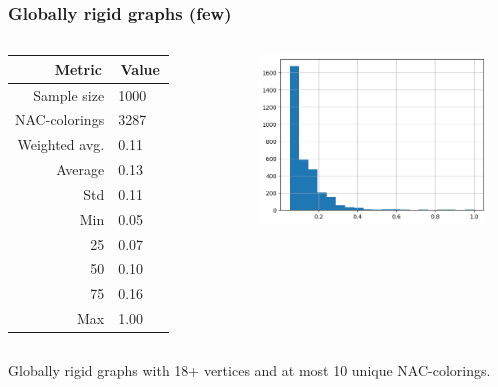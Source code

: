 \documentclass[aspectratio=\myaspectratio]{beamer}
\begin{document}
\begin{frame}
	\frametitle{Globally rigid graphs (few)}

	\begin{columns}

		\begin{table}[ht]
			\centering
			\begin{tabular}{r|l}
				\toprule
				\,Metric\,    & \,Value\, \\
				\midrule
				Sample size   & 1000      \\
				NAC-colorings & 3287      \\
				Weighted avg. & 0.11      \\
				Average       & 0.13      \\
				Std           & 0.11      \\
				Min           & 0.05      \\
				25            & 0.07      \\
				50            & 0.10      \\
				75            & 0.16      \\
				Max           & 1.00      \\
				\bottomrule
			\end{tabular}
		\end{table}


		\includegraphics[width=0.9\textwidth]{./assets/presentation_reviewer_globally_rigid_few.png}

	\end{columns}

	\centering
	Globally rigid graphs with 18+ vertices and at most 10 unique NAC-colorings.
\end{frame}
\end{document}

